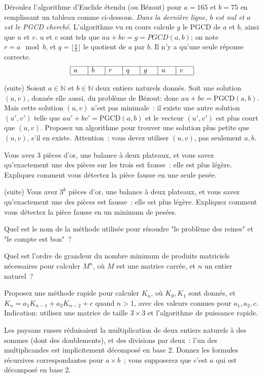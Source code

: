 \documentclass[11pt]{article}
\def\N{\mathbb N}
\begin{document}
 {D\'eroulez l'algorithme d'Euclide \'etendu (ou Bézout) pour $a=165$ et $b=75$ en remplissant un tableau comme ci-dessous. {\it Dans la dernière ligne, $b$ est nul et $a$ est le PGCD cherché}.
L'algorithme vu en cours calcule $g$ le PGCD de $a$ et $b$, ainsi que $u$ et $v$. $u$ et $v$ sont tels que $au+bv=g=PGCD(a,b)$; on note $r=a \mod b$, et $q=\lfloor \frac{a}{b}\rfloor$
le quotient de $a$ par $b$.   Il n'y a qu'une seule réponse correcte.
{\large
$$
\begin{array}{|c|c|c|c|c|c|c|}
\hline
a\quad & b \quad& r \quad& q \quad& g \quad& u \quad& v \quad\\
\hline
\end{array}$$
}

 (suite) Soient $a\in \N$ et $b\in\N$ deux entiers naturels donnés. Soit une solution $(u, v)$, donnée elle aussi, 
du problème de Bézout: donc
$au + bv =\mbox{PGCD}(a, b)$. Mais cette solution $(u, v)$ n'est pas minimale~: 
il existe une autre solution $(u', v')$ telle que $au'+bv'=\mbox{PGCD}(a,b)$ et le vecteur $(u',v')$ est plus court que $(u,v)$. Proposez un algorithme
pour trouver une solution plus petite que $(u, v)$, s'il en existe. 
Attention~: vous devez utiliser $(u, v)$, pas seulement $a, b$.

 Vous avez 3 pièces d'or, une balance à deux plateaux, et vous savez qu'exactement une des pièces sur les trois est fausse~: elle est plus légère. Expliquez comment vous détectez la pièce fausse en une seule pesée.

 (suite)  Vous avez  $3^k$  pièces d'or, une balance à deux plateaux, et vous savez qu'exactement une des pièces  est fausse~: elle est plus légère. Expliquez comment vous détectez la pièce fausse en un minimum de pesées.

{
 {Quel est le nom de la méthode utilisée pour résoudre "le problème des reines" et "le compte est bon"~?}


 {Quel est l'ordre de grandeur du nombre minimum de 
produits matriciels nécessaires pour calculer $M^n$, où $M$ est une matrice carrée, et $n$ un entier naturel~?}

 {Proposez une m\'ethode rapide pour calculer $K_n$, o\`u $K_0, K_1$ sont donn\'es,
et $K_{n}= a_1 K_{n-1} + a_2 K_{n-2} + c$ quand $n>1$, avec des valeurs connues pour  $a_1, a_2, c$. Indication: utilisez une matrice de taille $3\times 3$ et l'algorithme de puissance rapide.}


 Les paysans russes réduisaient la multiplication  de deux entiers naturels à des sommes (dont des doublements), et des divisions par deux~: l'un des multiplicandes est implicitement décomposé en base 2. Donnez les formules récursives correspondantes pour $a\times b$~; vous supposerez que c'est $a$ qui est décomposé en base 2. 


}}
\end{document}
